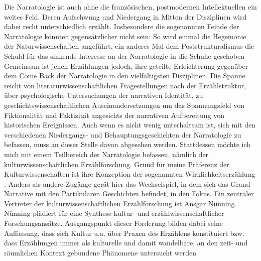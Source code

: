 Die Narratologie ist auch ohne die französischen, postmodernen Intellektuellen
ein weites Feld. Deren Aufschwung und Niedergang in Mitten der Disziplinen wird
dabei recht unterschiedlich erzählt. Insbesondere die sogenannten Feinde der
Narratologie könnten gegensätzlicher nicht sein: So wird einmal die Hegemonie
der Naturwissenschaften\footnotemark {} angeführt, ein anderes Mal dem Poststrukturalismus die
Schuld für das sinkende Interesse an der Narratologie in die Schuhe
geschoben\footnotemark {} Gemeinsam ist jenen Erzählungen jedoch, ihre geteilte Erleichterung
gegenüber dem Come Back der Narratologie in den vielfältigsten Disziplinen. Die
Spanne reicht von literaturwissenschaftlichen Fragestellungen nach der
Erzählstruktur, über psychologische Untersuchungen der narrativen Identität, zu
geschichtswissenschaftlichen Auseinandersetzungen um das Spannungsfeld von
Fiktionalität und Faktizität angesichts der narrativen Aufbereitung von
historischen Ereignissen. Auch wenn es nicht wenig unterhaltsam ist, sich mit
den verschiedenen Niedergangs- und Behauptungsgeschichten der Narratologie zu
befassen, muss an dieser Stelle davon abgesehen werden. Stattdessen möchte ich
mich mit einem Teilbereich der Narratologie befassen, nämlich der
kulturwissenschaftlichen Erzählforschung. Grund für meine Präferenz der
Kulturwissenschaften ist ihre Konzeption der sogenannten
\glqq Wirklichkeitserzählung \grqq\footnotemark {}. Anders als andere Zugänge gerät hier das
Wechselspiel, in dem sich das Grand Narrative mit den Partikularen Geschichten
befindet, in den Fokus. Ein zentraler Vertreter der kulturwissenschaftlichen 
Erzählforschung ist Ansgar Nünning. Nünning plädiert für eine Synthese kultur-
und erzählwissenschaftlicher Forschungsansätze.\footnotemark {}
Ausgangspunkt dieser Forderung
bilden dabei seine Auffassung, dass sich Kultur u.a. über Praxen des Erzählens
konstituiert bzw. dass Erzählungen immer als kulturelle und damit wandelbare,
an den zeit- und räumlichen Kontext gebundene Phänomene untersucht werden
